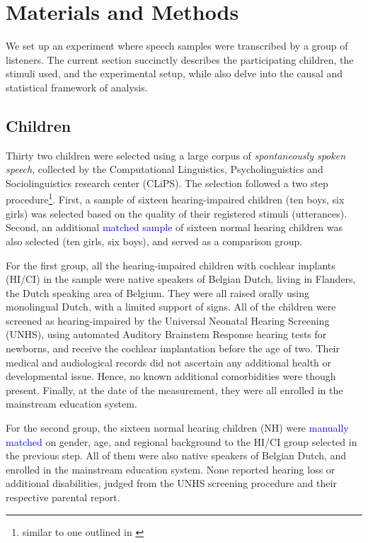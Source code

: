 \section{Materials and Methods}
%
We set up an experiment where speech samples were transcribed by a group of listeners. The current section succinctly describes the participating children, the stimuli used, and the experimental setup, while also delve into the causal and statistical framework of analysis.
%
%
\subsection{Children}
%
Thirty two children were selected using a large corpus of \textit{spontaneously spoken speech}, collected by the Computational Linguistics, Psycholinguistics and Sociolinguistics research center (CLiPS). The selection followed a two step procedure\footnote{similar to one outlined in \citet{Faes_et_al_2021}}. First, a sample of sixteen hearing-impaired children (ten boys, six girls) was selected based on the quality of their registered stimuli (utterances). Second, an additional \textcolor{blue}{matched sample} of sixteen normal hearing children was also selected (ten girls, six boys), and served as a comparison group.

For the first group, all the hearing-impaired children with cochlear implants (HI/CI) in the sample were native speakers of Belgian Dutch, living in Flanders, the Dutch speaking area of Belgium. They were all raised orally using monolingual Dutch, with a limited support of signs. All of the children were screened as hearing-impaired by the Universal Neonatal Hearing Screening (UNHS), using automated Auditory Brainstem Response hearing tests for newborns, and receive the cochlear implantation before the age of two. Their medical and audiological records did not ascertain any additional health or developmental issue. Hence, no known additional comorbidities were though present. Finally, at the date of the measurement, they were all enrolled in the mainstream education system.

For the second group, the sixteen normal hearing children (NH) were \textcolor{blue}{manually matched} on gender, age, and regional background to the HI/CI group selected in the previous step. All of them were also native speakers of Belgian Dutch, and enrolled in the mainstream education system. None reported hearing loss or additional disabilities, judged from the UNHS screening procedure and their respective parental report.

